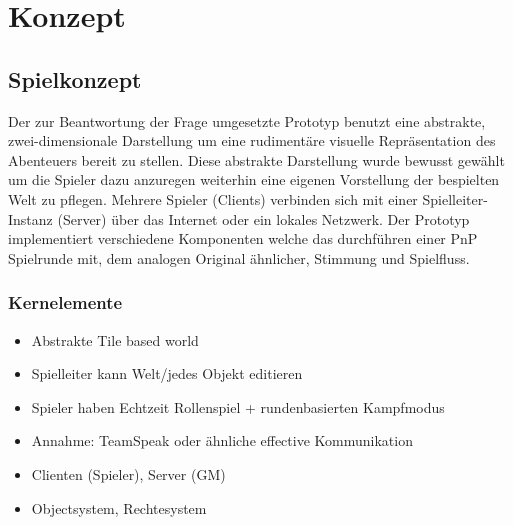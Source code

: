 \chapter{Konzept}
\label{concept}


\section{Spielkonzept}
\label{sec:Grobkonzept}
Der zur Beantwortung der Frage umgesetzte Prototyp benutzt eine abstrakte, zwei-dimensionale Darstellung um eine rudimentäre visuelle Repräsentation des Abenteuers bereit zu stellen. Diese abstrakte Darstellung wurde bewusst gewählt um die Spieler dazu anzuregen weiterhin eine eigenen Vorstellung der bespielten Welt zu pflegen. Mehrere Spieler (Clients) verbinden sich mit einer Spielleiter-Instanz (Server) über das Internet  oder ein lokales Netzwerk. Der Prototyp implementiert verschiedene Komponenten welche das durchführen einer PnP Spielrunde mit, dem analogen Original ähnlicher, Stimmung und Spielfluss.



\subsection{Kernelemente}

\begin{itemize}
	\item Abstrakte Tile based world
	\item Spielleiter kann Welt/jedes Objekt editieren
	\item Spieler haben Echtzeit Rollenspiel + rundenbasierten Kampfmodus
	\item Annahme: TeamSpeak oder ähnliche effective Kommunikation
	\item Clienten (Spieler),  Server (GM)
	\item Objectsystem, Rechtesystem
\end{itemize}

